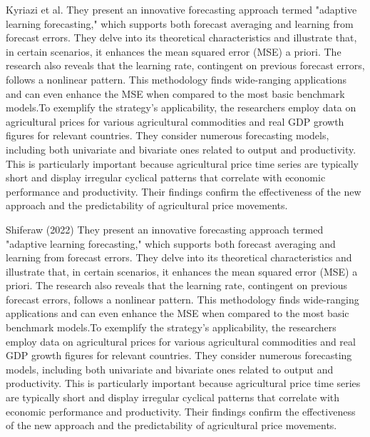         Kyriazi et al. \cite{kyriazi2019} They present an innovative forecasting approach termed "adaptive learning forecasting," which supports both forecast averaging and learning from forecast errors. They delve into its theoretical characteristics and illustrate that, in certain scenarios, it enhances the mean squared error (MSE) a priori. The research also reveals that the learning rate, contingent on previous forecast errors, follows a nonlinear pattern. This methodology finds wide-ranging applications and can even enhance the MSE when compared to the most basic benchmark models.To exemplify the strategy's applicability, the researchers employ data on agricultural prices for various agricultural commodities and real GDP growth figures for relevant countries. They consider numerous forecasting models, including both univariate and bivariate ones related to output and productivity. This is particularly important because agricultural price time series are typically short and display irregular cyclical patterns that correlate with economic performance and productivity. Their findings confirm the effectiveness of the new approach and the predictability of agricultural price movements.
        
        Shiferaw (2022) \cite{shiferaw2023} They present an innovative forecasting approach termed "adaptive learning forecasting," which supports both forecast averaging and learning from forecast errors. They delve into its theoretical characteristics and illustrate that, in certain scenarios, it enhances the mean squared error (MSE) a priori. The research also reveals that the learning rate, contingent on previous forecast errors, follows a nonlinear pattern. This methodology finds wide-ranging applications and can even enhance the MSE when compared to the most basic benchmark models.To exemplify the strategy's applicability, the researchers employ data on agricultural prices for various agricultural commodities and real GDP growth figures for relevant countries. They consider numerous forecasting models, including both univariate and bivariate ones related to output and productivity. This is particularly important because agricultural price time series are typically short and display irregular cyclical patterns that correlate with economic performance and productivity. Their findings confirm the effectiveness of the new approach and the predictability of agricultural price movements.
        
